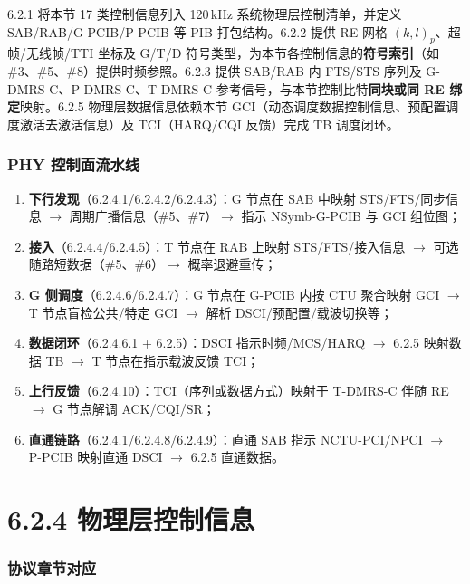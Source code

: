 \documentclass[11pt,a4paper]{ctexart}
\begin{document}
6.2.1 将本节 17 类控制信息列入 120\,kHz 系统物理层控制清单，并定义 SAB/RAB/G-PCIB/P-PCIB 等 PIB 打包结构。6.2.2 提供 RE 网格 $(k,l)_p$、超帧/无线帧/TTI 坐标及 G/T/D 符号类型，为本节各控制信息的\textbf{符号索引}（如 \#3、\#5、\#8）提供时频参照。6.2.3 提供 SAB/RAB 内 FTS/STS 序列及 G-DMRS-C、P-DMRS-C、T-DMRS-C 参考信号，与本节控制比特\textbf{同块或同 RE 绑定}映射。6.2.5 物理层数据信息依赖本节 GCI（动态调度数据控制信息、预配置调度激活去激活信息）及 TCI（HARQ/CQI 反馈）完成 TB 调度闭环。

\section{PHY 控制面流水线}

\begin{enumerate}[nosep]
  \item \textbf{下行发现}（6.2.4.1/6.2.4.2/6.2.4.3）：G 节点在 SAB 中映射 STS/FTS/同步信息 $\rightarrow$ 周期广播信息（\#5、\#7）$\rightarrow$ 指示 NSymb-G-PCIB 与 GCI 组位图；
  \item \textbf{接入}（6.2.4.4/6.2.4.5）：T 节点在 RAB 上映射 STS/FTS/接入信息 $\rightarrow$ 可选随路短数据（\#5、\#6）$\rightarrow$ 概率退避重传；
  \item \textbf{G 侧调度}（6.2.4.6/6.2.4.7）：G 节点在 G-PCIB 内按 CTU 聚合映射 GCI $\rightarrow$ T 节点盲检公共/特定 GCI $\rightarrow$ 解析 DSCI/预配置/载波切换等；
  \item \textbf{数据闭环}（6.2.4.6.1 + 6.2.5）：DSCI 指示时频/MCS/HARQ $\rightarrow$ 6.2.5 映射数据 TB $\rightarrow$ T 节点在指示载波反馈 TCI；
  \item \textbf{上行反馈}（6.2.4.10）：TCI（序列或数据方式）映射于 T-DMRS-C 伴随 RE $\rightarrow$ G 节点解调 ACK/CQI/SR；
  \item \textbf{直通链路}（6.2.4.1/6.2.4.8/6.2.4.9）：直通 SAB 指示 NCTU-PCI/NPCI $\rightarrow$ P-PCIB 映射直通 DSCI $\rightarrow$ 6.2.5 直通数据。
\end{enumerate}

\newpage
\part{6.2.4 物理层控制信息}

\section{协议章节对应}
\end{document}
